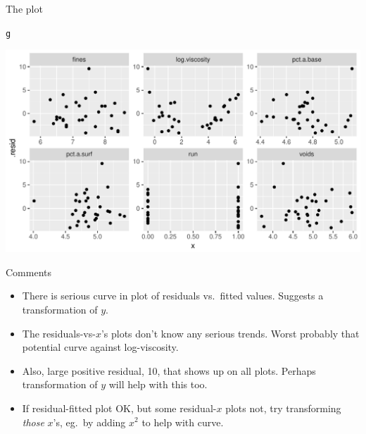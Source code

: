 \documentclass[unknownkeysallowed]{beamer}\usepackage[]{graphicx}\usepackage[]{color}
\makeatletter
\def\maxwidth{ %
  \ifdim\Gin@nat@width>\linewidth
    \linewidth
  \else
    \Gin@nat@width
  \fi
}
\newcommand{\hlstd}[1]{\textcolor[rgb]{0.345,0.345,0.345}{#1}}%
\newenvironment{kframe}{%
 \def\at@end@of@kframe{}%
 \ifinner\ifhmode%
  \def\at@end@of@kframe{\end{minipage}}%
  \begin{minipage}{\columnwidth}%
 \fi\fi%
 \def\FrameCommand##1{\hskip\@totalleftmargin \hskip-\fboxsep
 \colorbox{shadecolor}{##1}\hskip-\fboxsep
     \hskip-\linewidth \hskip-\@totalleftmargin \hskip\columnwidth}%
 \MakeFramed {\advance\hsize-\width
   \@totalleftmargin\z@ \linewidth\hsize
   \@setminipage}}%
 {\par\unskip\endMakeFramed%
 \at@end@of@kframe}
\newenvironment{knitrout}{}{} %
\makeatother
\begin{document}
\begin{frame}[fragile]{The plot}
  
\begin{knitrout}
\color{fgcolor}\begin{kframe}
\begin{alltt}
\hlstd{g}
\end{alltt}
\end{kframe}
\includegraphics[width=\maxwidth]{figure/unnamed-chunk-291-1} 

\end{knitrout}
  
\end{frame}


\begin{frame}[fragile]{Comments}
  
  \begin{itemize}
  \item There is serious curve in plot of residuals vs.\ fitted
    values. Suggests a transformation of $y$.
  \item The residuals-vs-$x$'s plots don't know any serious
    trends. Worst probably that potential curve against log-viscosity.
  \item Also, large positive residual, 10, that shows up on all
    plots. Perhaps transformation of $y$ will help with this too.
  \item If residual-fitted plot OK, but some residual-$x$ plots not,
    try transforming \emph{those} $x$'s, eg.\ by adding $x^2$ to help
    with curve.
  \end{itemize}
\end{frame}
\end{document}
